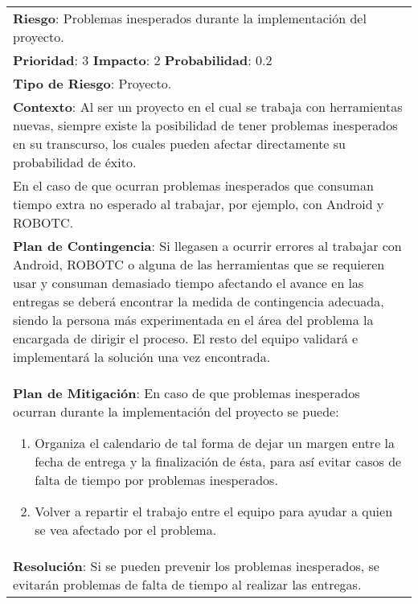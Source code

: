 \begin{table}[htbp!]
  \begin{tabular}{|p{15cm}|}\hline
    {\bf Riesgo}: Problemas inesperados durante la implementaci\'on del proyecto.\\%
    {\bf Prioridad}: 3  {\bf Impacto}: 2  {\bf Probabilidad}: 0.2\\%
    {\bf Tipo de Riesgo}: Proyecto.\\%
    {\bf Contexto}: Al ser un proyecto en el cual se trabaja con herramientas nuevas, siempre existe la posibilidad de tener problemas inesperados en su transcurso, los cuales pueden afectar directamente su probabilidad de \'exito.\\En el caso de que ocurran problemas inesperados que consuman tiempo extra no esperado al trabajar, por ejemplo, con  Android y ROBOTC.\\%
    {\bf Plan de Contingencia}: Si llegasen a ocurrir errores al trabajar con Android, ROBOTC o alguna de las herramientas que se requieren usar y consuman demasiado tiempo afectando el avance en las entregas se  deber\'a encontrar la medida de contingencia adecuada, siendo la persona m\'as experimentada en el \'area del problema la encargada de dirigir el proceso. El resto del equipo validar\'a e implementar\'a la soluci\'on una vez encontrada.\\%
    {\bf Plan de Mitigaci\'on}:  En caso de que problemas inesperados ocurran durante la implementaci\'on  del proyecto se puede:\begin{enumerate}\item Organiza el calendario de tal forma de dejar un margen entre la fecha de entrega y la finalizaci\'on de \'esta, para as\'i evitar casos de falta de tiempo por problemas inesperados.\item Volver a repartir el trabajo entre el equipo para ayudar a quien se vea afectado por el problema.\end{enumerate}\\%
    {\bf Resoluci\'on}: Si se pueden prevenir los problemas inesperados, se evitar\'an problemas de falta de tiempo al realizar las entregas.\\\hline
  \end{tabular}
  \caption{}
  \label{table:R7}
\end{table}


